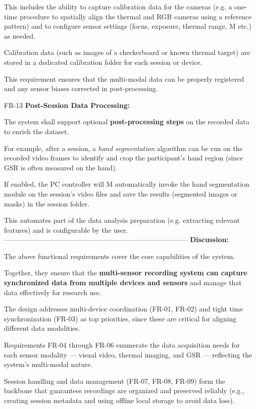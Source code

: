 This includes the ability to capture calibration data for the cameras (e.g. a
one-time procedure to spatially align the thermal and RGB cameras using a
reference pattern) and to configure sensor settings (focus, exposure, thermal
range, M etc.) as needed.

Calibration data (such as images of a checkerboard or known thermal target) are
stored in a dedicated calibration folder for each session or device.

This requirement ensures that the multi-modal data can be properly registered
and any sensor biases corrected in post-processing.

FR-13 \textbf{Post-Session Data Processing:}

The system shall support optional \textbf{post-processing steps}
 on the recorded data to enrich the dataset.

For example, after a session, a \textit{hand segmentation} algorithm can be run on the recorded video frames to identify and crop the participant's hand region (since GSR is often measured on the hand).

If enabled, the PC controller will M automatically invoke the hand segmentation
module on the session's video files and save the results (segmented images or
masks) in the session folder.

This automates part of the data analysis preparation (e.g.
extracting relevant features) and is configurable by the user.
-------------------------------------------------------------------------------- \textbf{Discussion:}

The above functional requirements cover the core capabilities of the system.

Together, they ensure that the \textbf{multi-sensor recording system can capture synchronized data from multiple devices and sensors}
 and manage that data effectively for research use.

The design addresses multi-device coordination (FR-01, FR-02) and tight time
synchronization (FR-03) as top priorities, since these are critical for aligning
different data modalities.

Requirements FR-04 through FR-06 enumerate the data acquisition needs for each
sensor modality --- visual video, thermal imaging, and GSR --- reflecting the
system's multi-modal nature.

Session handling and data management (FR-07, FR-08, FR-09) form the backbone
that guarantees recordings are organized and preserved reliably (e.g., creating
session metadata and using offline local storage to avoid data loss).

